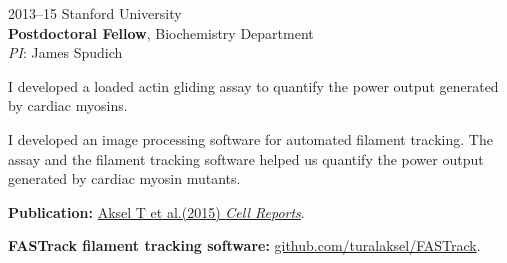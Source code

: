 \documentclass[12pt,letterpaper]{report}
\newcommand{\listitemspace}{0.25em}
\renewenvironment{itemize}
{\begin{list}{}{\setlength{\leftmargin}{0em}
                \setlength{\parskip}{0em}
                \setlength{\itemsep}{\listitemspace}
                \setlength{\parsep}{\listitemspace}}}
{\end{list}}
\begin{document}
\begin{tablist}
        \item[2013--15]\tab{}Stanford University \\
                             \textbf{Postdoctoral Fellow}, Biochemistry Department \\
                             \textit{PI}: James Spudich \\
                             \begin{itemize}
                                \item \textbullet \hspace{0.2cm} I developed a loaded actin gliding assay to quantify the power output generated by cardiac myosins.
                                \item \textbullet \hspace{0.2cm} I developed an image processing software for automated filament tracking. The assay and the filament tracking software helped us quantify the power output generated by cardiac myosin mutants.   
                                \begin{itemize}
                                    \item \hspace{1cm} \textbf{Publication:} \href{https://doi.org/10.1016/j.celrep.2015.04.006}{Aksel T et al.(2015) \textit{Cell Reports}}. 
                                    \item \hspace{1cm} \textbf{FASTrack filament tracking software:} \href{https://github.com/turalaksel/FASTrack} {github.com/turalaksel/FASTrack}. 
                                \end{itemize}
                             \end{itemize}  


\end{tablist}
\end{document}
